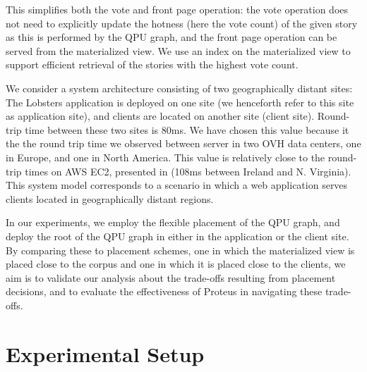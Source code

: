 This simplifies both the vote and front page operation:
the vote operation does not need to explicitly update the hotness (here the vote count) of the given story as this
is performed by the QPU graph,
and the front page operation can be served from the materialized view.
We use an index on the materialized view to support efficient retrieval of the stories with the highest vote count.

\bigskip
\noindent
We consider a system architecture consisting of two geographically distant sites:
The Lobsters application is deployed on one site (we henceforth refer to this site as application site),
and clients are located on another site (client site).
Round-trip time between these two sites is 80ms.
We have chosen this value because it the the round trip time we observed between server in two OVH data centers,
one in Europe, and one in North America.
This value is relatively close to the round-trip times on AWS EC2, presented in \cite{pbailis:hats} (108ms between Ireland and N. Virginia).
This system model corresponds to a scenario in which a web application serves clients located in geographically distant regions.

In our experiments, we employ the flexible placement of the QPU graph,
and deploy the root of the QPU graph in either in the application or the client site.
By comparing these to placement schemes, one in which the materialized view is placed close to the corpus and one in which
it is placed close to the clients, we aim is to validate our analysis about the trade-offs resulting from placement decisions,
and to evaluate the effectiveness of Proteus in navigating these trade-offs.

\section{Experimental Setup}

